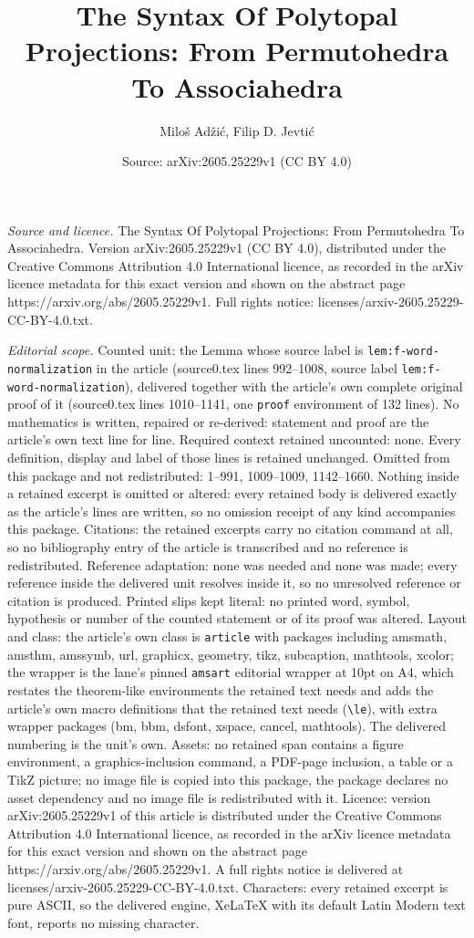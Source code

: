 \documentclass[10pt,a4paper]{amsart}
\title[The Syntax Of Polytopal Projections: From Permutohedra To As]{The Syntax Of Polytopal Projections: From Permutohedra To Associahedra}
\author{Milo\v{s} Ad\v{z}i\'c, Filip D. Jevti\'c}
\date{Source: arXiv:2605.25229v1 (CC BY 4.0)}
\begin{document}
\maketitle

\noindent\emph{Source and licence.} The Syntax Of Polytopal Projections: From Permutohedra To Associahedra. Version arXiv:2605.25229v1 (CC BY 4.0), distributed under the Creative Commons Attribution 4.0 International licence, as recorded in the arXiv licence metadata for this exact version and shown on the abstract page https://arxiv.org/abs/2605.25229v1. Full rights notice: licenses/arxiv-2605.25229-CC-BY-4.0.txt.\par\smallskip

\noindent\textit{Editorial scope.} Counted unit: the Lemma whose source label is \texttt{lem:f-word-normalization} in the article (source0.tex lines 992--1008, source label \texttt{lem:f-word-normalization}), delivered together with the article's own complete original proof of it (source0.tex lines 1010--1141, one \texttt{proof} environment of 132 lines). No mathematics is written, repaired or re-derived: statement and proof are the article's own text line for line. Required context retained uncounted: none. Every definition, display and label of those lines is retained unchanged. Omitted from this package and not redistributed: 1--991, 1009--1009, 1142--1660. Nothing inside a retained excerpt is omitted or altered: every retained body is delivered exactly as the article's lines are written, so no omission receipt of any kind accompanies this package. Citations: the retained excerpts carry no citation command at all, so no bibliography entry of the article is transcribed and no reference is redistributed. Reference adaptation: none was needed and none was made; every reference inside the delivered unit resolves inside it, so no unresolved reference or citation is produced. Printed slips kept literal: no printed word, symbol, hypothesis or number of the counted statement or of its proof was altered. Layout and class: the article's own class is \texttt{article} with packages including amsmath, amsthm, amssymb, url, graphicx, geometry, tikz, subcaption, mathtools, xcolor; the wrapper is the lane's pinned \texttt{amsart} editorial wrapper at 10pt on A4, which restates the theorem-like environments the retained text needs and adds the article's own macro definitions that the retained text needs (\texttt{\textbackslash le}), with extra wrapper packages (bm, bbm, dsfont, xspace, cancel, mathtools). The delivered numbering is the unit's own. Assets: no retained span contains a figure environment, a graphics-inclusion command, a PDF-page inclusion, a table or a TikZ picture; no image file is copied into this package, the package declares no asset dependency and no image file is redistributed with it. Licence: version arXiv:2605.25229v1 of this article is distributed under the Creative Commons Attribution 4.0 International licence, as recorded in the arXiv licence metadata for this exact version and shown on the abstract page https://arxiv.org/abs/2605.25229v1. A full rights notice is delivered at licenses/arxiv-2605.25229-CC-BY-4.0.txt. Characters: every retained excerpt is pure ASCII, so the delivered engine, XeLaTeX with its default Latin Modern text font, reports no missing character.
\end{document}
